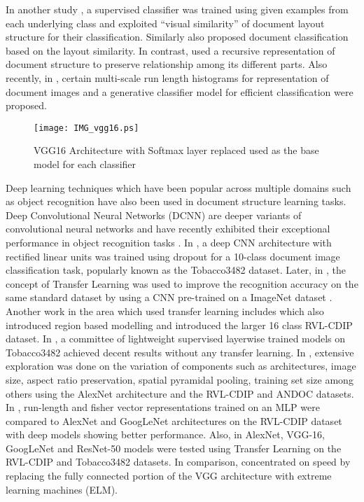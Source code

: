 \documentclass[10pt,conference,a4paper]{IEEEtran}
\begin{document}
In another study \cite{shin2001}, a supervised classifier was trained using  given examples from each underlying class and exploited “visual similarity” of document layout structure for their classification. Similarly \cite{hu2000} also proposed document classification based on the layout similarity. In contrast, \cite{diligenti2003} used a recursive representation of document structure to preserve relationship among its different parts. Also recently, in \cite{gordo2013}, certain multi-scale run length histograms for representation of document images and a generative classifier model for efficient classification were proposed.


\begin{figure}[t]
	\centering
	\texttt{[image: IMG\_vgg16.ps]}
	\caption{VGG16 Architecture with Softmax layer replaced used as the base model for each classifier} \label{fig:DCNNarch}
\end{figure}


Deep learning techniques which have been popular across multiple domains such as object recognition have also been used in document structure learning tasks. Deep Convolutional Neural Networks (DCNN) are deeper variants of convolutional neural networks \cite{lecun1998} and have recently exhibited their exceptional performance in object recognition tasks \cite{Krizhevsky2012,szegedy2015going}. In \cite{kang2014}, a deep CNN architecture with rectified linear units was trained using dropout \cite{Srivastava2014} for a 10-class document image classification task, popularly known as the Tobacco3482 dataset\cite{Kumar2014}. Later, in \cite{afzal2015}, the concept of Transfer Learning \cite{Pan2010} was used to improve the recognition accuracy on the same standard dataset by using a CNN pre-trained on a ImageNet dataset \cite{deng2009}. Another work in the area which used transfer learning includes \cite{harley2015evaluation} which also introduced region based modelling and introduced the larger 16 class RVL-CDIP dataset. In \cite{roy2016generalized}, a committee of lightweight supervised layerwise trained models on Tobacco3482 achieved decent results without any transfer learning. In \cite{tensmeyer2017analysis}, extensive exploration was done on the variation of components such as architectures, image size, aspect ratio preservation, spatial pyramidal pooling, training set size among others using the AlexNet architecture and the RVL-CDIP and ANDOC datasets. In \cite{csurka2016right}, run-length and fisher vector representations trained on an MLP were compared to AlexNet and GoogLeNet architectures on the RVL-CDIP dataset with deep models showing better performance. Also, in \cite{afzal2017cutting} AlexNet, VGG-16, GoogLeNet and ResNet-50 models were tested using Transfer Learning on the RVL-CDIP and Tobacco3482 datasets. In comparison, \cite{kolsch2017real} concentrated on speed by replacing the fully connected portion of the VGG architecture with extreme learning machines (ELM).
\end{document}
